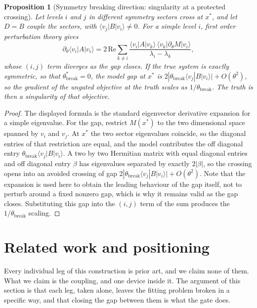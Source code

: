 \documentclass[11pt]{article}
\newtheorem{prop}{Proposition}
\begin{document}
\begin{prop}[Symmetry breaking direction: singularity at a protected crossing]
\label{prop:break}
Let levels $i$ and $j$ in different symmetry sectors cross at $x^\ast$, and let
$D=B$ couple the sectors, with $\langle v_j|B|v_i\rangle\ne0$. For a simple level
$i$, first order perturbation theory gives
\[
\partial_\theta\langle v_i|A|v_i\rangle
=2\,\mathrm{Re}\!\!\sum_{k\ne i}
\frac{\langle v_i|A|v_k\rangle\,\langle v_k|\partial_\theta M|v_i\rangle}
{\lambda_i-\lambda_k},
\]
whose $(i,j)$ term diverges as the gap closes. If the true system is exactly
symmetric, so that $\theta^\ast_{\mathrm{break}}=0$, the model gap at $x^\ast$ is
$2|\theta_{\mathrm{break}}\langle v_j|B|v_i\rangle|+O(\theta^2)$, so the gradient
of the ungated objective at the truth scales as $1/\theta_{\mathrm{break}}$. The
truth is then a singularity of that objective.
\end{prop}
\begin{proof}
The displayed formula is the standard eigenvector derivative expansion for a
simple eigenvalue. For the gap, restrict $M(x^\ast)$ to the two dimensional
space spanned by $v_i$ and $v_j$. At $x^\ast$ the two sector eigenvalues
coincide, so the diagonal entries of that restriction are equal, and the model
contributes the off diagonal entry $\theta_{\mathrm{break}}\langle
v_j|B|v_i\rangle$. A two by two Hermitian matrix with equal diagonal entries and
off diagonal entry $\beta$ has eigenvalues separated by exactly $2|\beta|$, so
the crossing opens into an avoided crossing of gap
$2|\theta_{\mathrm{break}}\langle v_j|B|v_i\rangle|+O(\theta^2)$. Note that the
expansion is used here to obtain the leading behaviour of the gap itself, not to
perturb around a fixed nonzero gap, which is why it remains valid as the gap
closes. Substituting this gap into the $(i,j)$ term of the sum produces the
$1/\theta_{\mathrm{break}}$ scaling.
\end{proof}

\section{Related work and positioning}\label{sec:related}
Every individual leg of this construction is prior art, and we claim none of
them. What we claim is the coupling, and one device inside it. The argument of
this section is that each leg, taken alone, leaves the fitting problem broken in
a specific way, and that closing the gap between them is what the gate does.
\end{document}
